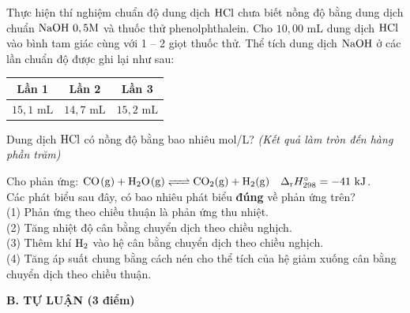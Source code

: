 \documentclass[11pt,a4paper]{article}
\begin{document}
\begin{ex}
Thực hiện thí nghiệm chuẩn độ dung dịch $\ce{HCl}$ chưa biết nồng độ bằng dung dịch chuẩn $\ce{NaOH}\ 0,5\text{M}$ và thuốc thử phenolphthalein. Cho $10,00\text{ mL}$ dung dịch $\ce{HCl}$ vào bình tam giác cùng với 1 -- 2 giọt thuốc thử. Thể tích dung dịch $\ce{NaOH}$ ở các lần chuẩn độ được ghi lại như sau:
\begin{center}
\renewcommand{\arraystretch}{1.2}
\begin{tabular}{|c|c|c|}
\hline
\rowcolor{tableGreen}
\textbf{Lần 1} & \textbf{Lần 2} & \textbf{Lần 3} \\
\hline
$15,1\text{ mL}$ & $14,7\text{ mL}$ & $15,2\text{ mL}$ \\
\hline
\end{tabular}
\end{center}
Dung dịch $\ce{HCl}$ có nồng độ bằng bao nhiêu mol/L? \textit{(Kết quả làm tròn đến hàng phần trăm)}

\end{ex}
\begin{ex}
Cho phản ứng: $\ce{CO(g) + H2O(g) <=> CO2(g) + H2(g)}\quad \Delta_{\mathrm{r}}H^{\circ}_{298} = -41\text{ kJ}$.\\
Các phát biểu sau đây, có bao nhiêu phát biểu \textbf{đúng} về phản ứng trên?\\
(1) Phản ứng theo chiều thuận là phản ứng thu nhiệt.\\
(2) Tăng nhiệt độ cân bằng chuyển dịch theo chiều nghịch.\\
(3) Thêm khí $\ce{H2}$ vào hệ cân bằng chuyển dịch theo chiều nghịch.\\
(4) Tăng áp suất chung bằng cách nén cho thể tích của hệ giảm xuống cân bằng chuyển dịch theo chiều thuận.

\end{ex}
\vspace{6pt}
\noindent
{\color{mainGreen}\textbf{\Large B. TỰ LUẬN (3 điểm)}}
\vspace{2pt}
\end{document}

